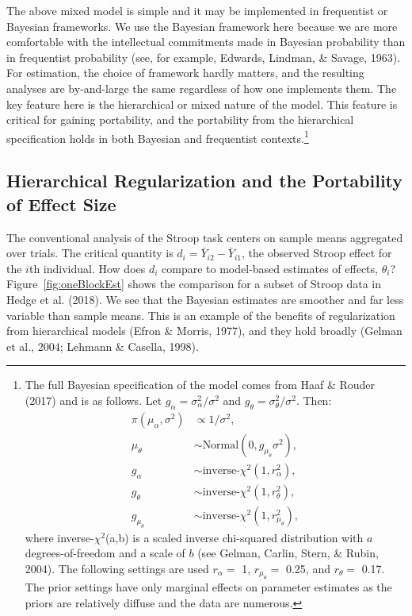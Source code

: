 \documentclass[english,man]{apa6}
\theoremstyle{definition}
\theoremstyle{definition}
\theoremstyle{remark}
\begin{document}
The above mixed model is simple and it may be implemented in frequentist
or Bayesian frameworks. We use the Bayesian framework here because we
are more comfortable with the intellectual commitments made in Bayesian
probability than in frequentist probability (see, for example, Edwards,
Lindman, \& Savage, 1963). For estimation, the choice of framework
hardly matters, and the resulting analyses are by-and-large the same
regardless of how one implements them. The key feature here is the
hierarchical or mixed nature of the model. This feature is critical for
gaining portability, and the portability from the hierarchical
specification holds in both Bayesian and frequentist contexts.\footnote{The
  full Bayesian specification of the model comes from Haaf \& Rouder
  (2017) and is as follows. Let \(g_\alpha=\sigma^2_\alpha/\sigma^2\)
  and \(g_\theta=\sigma^2_\theta/\sigma^2\). Then: \[
  \begin{aligned}
  \pi(\mu_\alpha,\sigma^2) &\propto 1/\sigma^2,\\
  \mu_\theta & \sim \mbox{Normal}(0,g_{\mu_\theta}\sigma^2),\\
  g_\alpha & \sim \mbox{inverse-$\chi^2$}(1,r^2_\alpha),\\
  g_\theta & \sim \mbox{inverse-$\chi^2$}(1,r^2_\theta),\\
  g_{\mu_\theta} & \sim \mbox{inverse-$\chi^2$}(1,r^2_{\mu_\theta}),
  \end{aligned}
  \] where inverse-\(\chi^2\)(a,b) is a scaled inverse chi-squared
  distribution with \(a\) degrees-of-freedom and a scale of \(b\) (see
  Gelman, Carlin, Stern, \& Rubin, 2004). The following settings are
  used \(r_\alpha=\) 1, \(r_{\mu_\theta}=\) 0.25, and \(r_\theta=\)
  0.17. The prior settings have only marginal effects on parameter
  estimates as the priors are relatively diffuse and the data are
  numerous.}

\subsection{Hierarchical Regularization and the Portability of Effect
Size}\label{hierarchical-regularization-and-the-portability-of-effect-size}

The conventional analysis of the Stroop task centers on sample means
aggregated over trials. The critical quantity is
\(d_i=\bar{Y}_{i2}-\bar{Y}_{i1}\), the observed Stroop effect for the
\(i\)th individual. How does \(d_i\) compare to model-based estimates of
effects, \(\theta_i\)? Figure~\ref{fig:oneBlockEst} shows the comparison
for a subset of Stroop data in Hedge et al. (2018). We see that the
Bayesian estimates are smoother and far less variable than sample means.
This is an example of the benefits of regularization from hierarchical
models (Efron \& Morris, 1977), and they hold broadly (Gelman et al.,
2004; Lehmann \& Casella, 1998).
\end{document}
